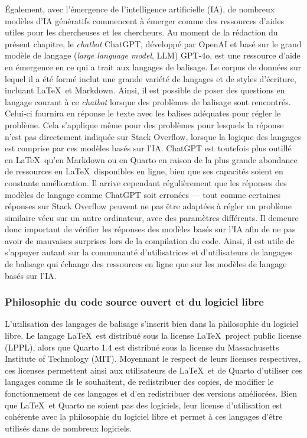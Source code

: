 \documentclass[
  letterpaper,
  DIV=11,
  numbers=noendperiod]{scrreprt}
\begin{document}
Également, avec l'émergence de l'intelligence artificielle (IA), de
nombreux modèles d'IA génératifs commencent à émerger comme des
ressources d'aides utiles pour les chercheuses et les chercheurs. Au
moment de la rédaction du présent chapitre, le \emph{chatbot} ChatGPT,
développé par OpenAI et basé sur le grand modèle de langage (\emph{large
language model}, LLM) GPT-4o, est une ressource d'aide en émergence en
ce qui a trait aux langages de balisage. Le corpus de données sur lequel
il a été formé inclut une grande variété de langages et de styles
d'écriture, incluant \LaTeX~et Markdown. Ainsi, il est possible de poser
des questions en langage courant à ce \emph{chatbot} lorsque des
problèmes de balisage sont rencontrés. Celui-ci fournira en réponse le
texte avec les balises adéquates pour régler le problème. Cela
s'applique même pour des problèmes pour lesquels la réponse n'est pas
directement indiquée sur Stack Overflow, lorsque la logique des langages
est comprise par ces modèles basés sur l'IA. ChatGPT est toutefois plus
outillé en \LaTeX~qu'en Markdown ou en Quarto en raison de la plus
grande abondance de ressources en \LaTeX~disponibles en ligne, bien que
ses capacités soient en constante amélioration. Il arrive cependant
régulièrement que les réponses des modèles de langage comme ChatGPT soit
erronées --- tout comme certaines réponses sur Stack Overflow peuvent ne
pas être adaptées à régler un problème similaire vécu sur un autre
ordinateur, avec des paramètres différents. Il demeure donc important de
vérifier les réponses des modèles basés sur l'IA afin de ne pas avoir de
mauvaises surprises lors de la compilation du code. Ainsi, il est utile
de s'appuyer autant sur la communauté d'utilisatrices et d'utilisateurs
de langages de balisage qui échange des ressources en ligne que sur les
modèles de langage basés sur l'IA.

\hypertarget{philosophie-du-code-source-ouvert-et-du-logiciel-libre}{%
\subsubsection{Philosophie du code source ouvert et du logiciel
libre}\label{philosophie-du-code-source-ouvert-et-du-logiciel-libre}}

L'utilisation des langages de balisage s'inscrit bien dans la
philosophie du logiciel libre. Le langage \LaTeX~est distribué sous la
license \LaTeX~project public license (LPPL), alors que Quarto 1.4 est
distribué sous la license du Massachusetts Institute of Technology
(MIT). Moyennant le respect de leurs licenses respectives, ces licenses
permettent ainsi aux utilisateurs de \LaTeX~et de Quarto d'utiliser ces
langages comme ils le souhaitent, de redistribuer des copies, de
modifier le fonctionnement de ces langages et d'en redistribuer des
versions améliorées. Bien que \LaTeX~et Quarto ne soient pas des
logiciels, leur license d'utilisation est cohérente avec la philosophie
du logiciel libre et permet à ces langages d'être utilisés dans de
nombreux logiciels.
\end{document}
